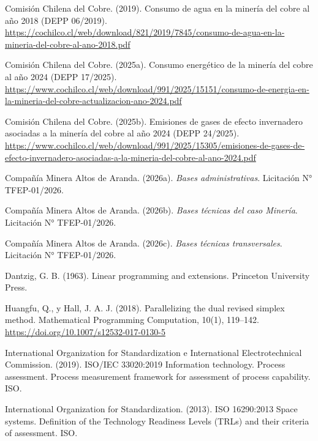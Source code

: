 \documentclass[subdoc]{../../comun/overfore}
\begin{document}
\begin{referencias}
\item Comisión Chilena del Cobre. (2019). Consumo de agua en la minería del cobre al año 2018 (DEPP 06/2019). \href{https://cochilco.cl/web/download/821/2019/7845/consumo-de-agua-en-la-mineria-del-cobre-al-ano-2018.pdf}{https://cochilco.cl/web/download/821/2019/7845/consumo-de-agua-en-la-mineria-del-cobre-al-ano-2018.pdf}
\item Comisión Chilena del Cobre. (2025a). Consumo energético de la minería del cobre al año 2024 (DEPP 17/2025). \href{https://www.cochilco.cl/web/download/991/2025/15151/consumo-de-energia-en-la-mineria-del-cobre-actualizacion-ano-2024.pdf}{https://www.cochilco.cl/web/download/991/2025/15151/consumo-de-energia-en-la-mineria-del-cobre-actualizacion-ano-2024.pdf}
\item Comisión Chilena del Cobre. (2025b). Emisiones de gases de efecto invernadero asociadas a la minería del cobre al año 2024 (DEPP 24/2025). \href{https://www.cochilco.cl/web/download/991/2025/15305/emisiones-de-gases-de-efecto-invernadero-asociadas-a-la-mineria-del-cobre-al-ano-2024.pdf}{https://www.cochilco.cl/web/download/991/2025/15305/emisiones-de-gases-de-efecto-invernadero-asociadas-a-la-mineria-del-cobre-al-ano-2024.pdf}
\item Compañía Minera Altos de Aranda. (2026a). \emph{Bases administrativas}. Licitación N° TFEP-01/2026.
\item Compañía Minera Altos de Aranda. (2026b). \emph{Bases técnicas del caso Minería}. Licitación N° TFEP-01/2026.
\item Compañía Minera Altos de Aranda. (2026c). \emph{Bases técnicas transversales}. Licitación N° TFEP-01/2026.
\item Dantzig, G. B. (1963). Linear programming and extensions. Princeton University Press.
\item Huangfu, Q., y Hall, J. A. J. (2018). Parallelizing the dual revised simplex method. Mathematical Programming Computation, 10(1), 119–142. \href{https://doi.org/10.1007/s12532-017-0130-5}{https://doi.org/10.1007/s12532-017-0130-5}
\item International Organization for Standardization e International Electrotechnical Commission. (2019). ISO/IEC 33020:2019 Information technology. Process assessment. Process measurement framework for assessment of process capability. ISO.
\item International Organization for Standardization. (2013). ISO 16290:2013 Space systems. Definition of the Technology Readiness Levels (TRLs) and their criteria of assessment. ISO.

\end{referencias}
\end{document}
